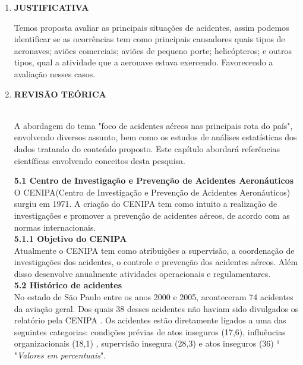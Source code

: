 \documentclass[14pt, a4paper]{article}
\begin{document}
\begin{enumerate}
		
		
		
		\item \textbf{JUSTIFICATIVA}\newline
		
		Temos proposta avaliar as principais situações de acidentes, assim podemos identificar se as ocorrências tem como principais causadores quais tipos de aeronaves; aviões comerciais; aviões de pequeno porte; helicópteros; e outros tipos, qual a atividade que a aeronave estava exercendo. Favorecendo a avaliação nesses casos.\\
		
		
		\item \textbf{REVISÃO TEÓRICA}\newline
		
		\\A abordagem do tema "foco de acidentes aéreos nas principais rota do país", envolvendo diversos assunto, bem como os estudos de análises estatísticas dos dados tratando do conteúdo proposto. Este capítulo abordará referências científicas envolvendo conceitos desta pesquisa.
		
		
		\textbf{5.1 Centro de Investigação e Prevenção de Acidentes Aeronáuticos}\\
		
		O CENIPA(Centro de Investigação e Prevenção de Acidentes Aeronáuticos) surgiu em 1971. A criação do CENIPA tem como intuito a realização de  investigações e promover a prevenção de acidentes aéreos, de acordo com as normas internacionais.
		\\
		
		\textbf{5.1.1 Objetivo do CENIPA}\\
		
		Atualmente o CENIPA tem como atribuições a supervisão, a coordenação de investigações dos acidentes, o controle e prevenção dos acidentes aéreos. Além disso desenvolve anualmente atividades operacionais e regulamentares.\\
		
		\textbf{5.2 Histórico de acidentes}\\
		
		No estado de São Paulo entre os anos 2000 e 2005, aconteceram 74 acidentes da aviação geral. Dos quais 38 desses acidentes não haviam sido divulgados os relatório pela CENIPA . Os acidentes estão diretamente ligados a uma das seguintes categorias: condições prévias de atos inseguros (17,6),  influências organizacionais (18,1) , supervisão insegura (28,3) e atos inseguros (36) ¹ "\textit{Valores em percentuais}".\\
		

\end{enumerate}
\end{document}
